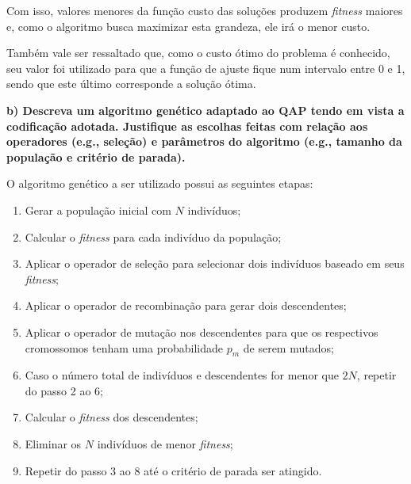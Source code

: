 \documentclass[a4paper, 12pt]{article}
\begin{document}
Com isso, valores menores da função custo das soluções produzem \textit{fitness} maiores e, como o algoritmo busca maximizar esta grandeza, ele irá o menor custo. 

Também vale ser ressaltado que, como o custo ótimo do problema é conhecido, seu valor foi utilizado para que a função de ajuste fique num intervalo entre 0 e 1, sendo que este último corresponde a solução ótima.

\textbf{b) Descreva um algoritmo genético adaptado ao QAP tendo em vista a codificação adotada. Justifique as escolhas feitas com relação aos operadores (e.g., seleção) e parâmetros do algoritmo (e.g., tamanho da população e critério de parada).}

O algoritmo genético a ser utilizado possui as seguintes etapas:
\begin{enumerate}
    \item Gerar a população inicial com $N$ indivíduos;
    \item Calcular o \textit{fitness} para cada indivíduo da população;
    \item Aplicar o operador de seleção para selecionar dois indivíduos baseado em seus \textit{fitness};
    \item Aplicar o operador de recombinação para gerar dois descendentes;
    \item Aplicar o operador de mutação nos descendentes para que os respectivos cromossomos tenham uma probabilidade $p_m$ de serem mutados;
    \item Caso o número total de indivíduos e descendentes for menor que $2N$, repetir do passo 2 ao 6;
    \item Calcular o \textit{fitness} dos descendentes;
    \item Eliminar os $N$ indivíduos de menor \textit{fitness};
    \item Repetir do passo 3 ao 8 até o critério de parada ser atingido.
\end{enumerate}
\end{document}
